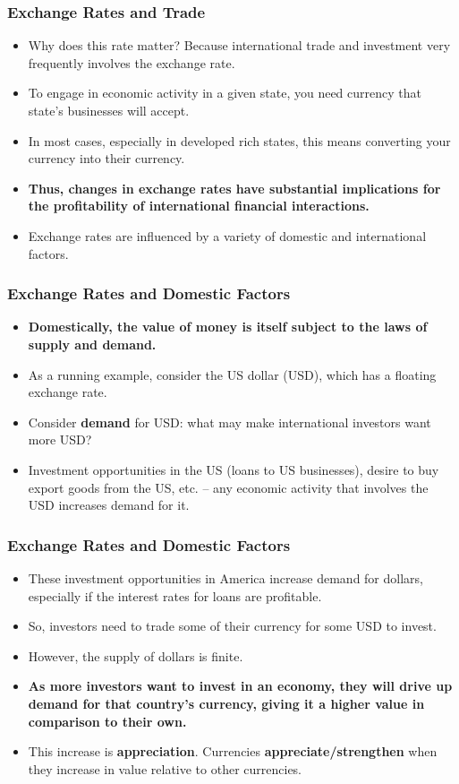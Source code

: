 \documentclass[handout]{beamer}
\begin{document}
\begin{frame} 
	\frametitle{\LARGE{Exchange Rates and Trade}}
	\begin{itemize}
		\item Why does this rate matter? Because international trade and investment very frequently involves the exchange rate. \pause
		\item To engage in economic activity in a given state, you need currency that state's businesses will accept. \pause
		\item In most cases, especially in developed rich states, this means converting your currency into their currency. \pause
		\item \textbf{Thus, changes in exchange rates have substantial implications for the profitability of international financial interactions.}
		\item Exchange rates are influenced by a variety of domestic and international factors.
	\end{itemize}
\end{frame}

\begin{frame} 
	\frametitle{\LARGE{Exchange Rates and Domestic Factors}}
	\begin{itemize}
		\item \textbf{Domestically, the value of money is itself subject to the laws of supply and demand.}
		\item As a running example, consider the US dollar (USD), which has a floating exchange rate.
		\item Consider \textbf{demand} for USD: what may make international investors want more USD? \pause
		\item Investment opportunities in the US (loans to US businesses), desire to buy export goods from the US, etc. -- any economic activity that involves the USD increases demand for it.
	\end{itemize}
\end{frame}

\begin{frame} 
	\frametitle{\LARGE{Exchange Rates and Domestic Factors}}
	\begin{itemize}
		\item These investment opportunities in America increase demand for dollars, especially if the interest rates for loans are profitable. \pause
		\item So, investors need to trade some of their currency for some USD to invest. \pause
		\item However, the supply of dollars is finite. \pause
		\item \textbf{As more investors want to invest in an economy, they will drive up demand for that country’s currency, giving it a higher value in comparison to their own.}
		\item This increase is \textbf{appreciation}. Currencies \textbf{appreciate/strengthen} when they increase in value relative to other currencies. 
	\end{itemize}
\end{frame}
\end{document}
